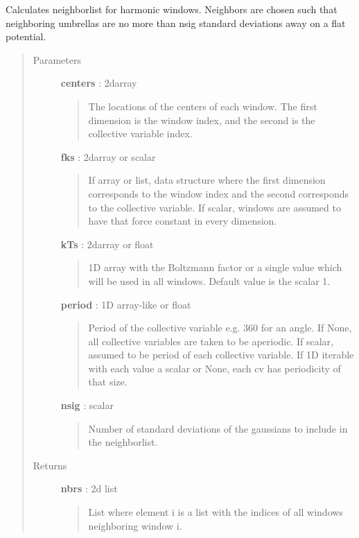 \documentclass[letterpaper,10pt,english]{sphinxmanual}
\begin{document}

\begin{fulllineitems}
\label{modules/usutils:usutils.neighbors_harmonic}
Calculates neighborlist for harmonic windows.  Neighbors are chosen 
such that neighboring umbrellas are no more than nsig standard
deviations away on a flat potential.
\begin{quote}\begin{description}
\item[{Parameters}] \leavevmode
\textbf{centers} : 2darray
\begin{quote}

The locations of the centers of each window.  The
first dimension is the window index, and the second
is the collective variable index.
\end{quote}

\textbf{fks} : 2darray or scalar
\begin{quote}

If array or list, data structure where the first dimension 
corresponds to the window index and the second corresponds to the
collective variable.  If scalar, windows are assumed to have that 
force constant in every dimension.
\end{quote}

\textbf{kTs} : 2darray or float
\begin{quote}

1D array with the Boltzmann factor or
a single value which will be used in all windows.  Default
value is the scalar 1.
\end{quote}

\textbf{period} : 1D array-like or float
\begin{quote}

Period of the collective variable
e.g. 360 for an angle. If None, all collective variables are 
taken to be aperiodic.  If scalar, assumed to be period of each 
collective variable. If 1D iterable with each value a scalar or 
None, each cv has periodicity of that size.
\end{quote}

\textbf{nsig} : scalar
\begin{quote}

Number of standard deviations of the gaussians to 
include in the neighborlist.
\end{quote}

\item[{Returns}] \leavevmode
\textbf{nbrs} : 2d list
\begin{quote}

List where element i is a list with the indices of all 
windows neighboring window i.
\end{quote}

\end{description}\end{quote}

\end{fulllineitems}
\end{document}
